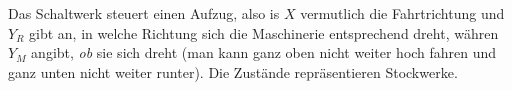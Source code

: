 \documentclass{CInf_practice}
\begin{document}
Das Schaltwerk steuert einen Aufzug, also is $X$ vermutlich die Fahrtrichtung
und $Y_R$ gibt an, in welche Richtung sich die Maschinerie entsprechend dreht,
währen $Y_M$ angibt, \emph{ob} sie sich dreht (man kann ganz oben nicht weiter
hoch fahren und ganz unten nicht weiter runter). Die Zustände repräsentieren
Stockwerke.
\end{document}
